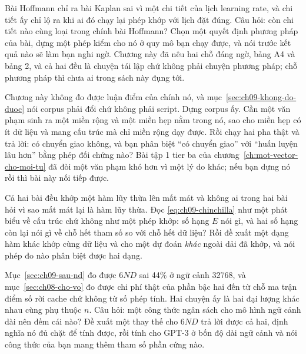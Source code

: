 \tierextend

\begin{bt}
  \item Bài Hoffmann chỉ ra bài Kaplan sai vì một chi tiết của lịch learning
    rate, và chi tiết ấy chỉ lộ ra khi ai đó chạy lại phép khớp với lịch đặt
    đúng. Câu hỏi: còn chi tiết nào cùng loại trong chính bài Hoffmann? Chọn
    một quyết định phương pháp của bài, dựng một phép kiểm cho nó ở quy mô bạn
    chạy được, và nói trước kết quả nào sẽ làm bạn nghi ngờ. Chương này đã nêu
    hai chỗ đáng ngờ, bảng A4 và bảng 2, và cả hai đều là chuyện tái lập chứ
    không phải chuyện phương pháp; chỗ phương pháp thì chưa ai trong sách này
    đụng tới.

  \item Chương này không đo được luận điểm của chính nó, và
    mục~\ref{sec:ch09-khong-do-duoc} nói corpus phải đổi chứ không phải script.
    Dựng corpus ấy. Cần một văn phạm sinh ra một miền rộng và một miền hẹp nằm
    trong nó, sao cho miền hẹp có ít dữ liệu và mang cấu trúc mà chỉ miền rộng
    dạy được. Rồi chạy hai pha thật và trả lời: có chuyển giao không, và bạn
    phân biệt \enquote{có chuyển giao} với \enquote{huấn luyện lâu hơn} bằng
    phép đối chứng nào? Bài tập 1 tier ba của
    chương~\ref{ch:mot-vector-cho-moi-tu} đã đòi một văn phạm khó hơn vì một lý
    do khác; nếu bạn dựng nó rồi thì bài này nối tiếp được.

  \item Cả hai bài  đều khớp một hàm lũy thừa
    lên mất mát và
    không ai trong hai bài hỏi vì sao mất mát lại là hàm lũy thừa. Đọc
    \eqref{eq:ch09-chinchilla} như một phát biểu về cấu trúc chứ không như một
    phép khớp: số hạng \(E\) nói gì, và hai số hạng còn lại nói gì về chỗ hết
    tham số so với chỗ hết dữ liệu? Rồi đề xuất một dạng hàm khác khớp cùng dữ
    liệu và cho một dự đoán \emph{khác} ngoài dải đã khớp, và nói phép đo nào
    phân biệt được hai dạng.

  \item Mục~\ref{sec:ch09-sau-nd} đo được \(6ND\) sai 44\% ở ngữ cảnh 32768, và
    mục~\ref{sec:ch08-cho-vo} đo được chi phí thật của phần bậc hai đến từ chỗ
    ma trận điểm số rời cache chứ không từ số phép tính. Hai chuyện ấy là hai
    đại lượng khác nhau cùng phụ thuộc \(n\). Câu hỏi: một công thức ngân sách
    cho mô hình ngữ cảnh dài nên đếm cái nào? Đề xuất một thay thế cho \(6ND\)
    trả lời được cả hai, định nghĩa nó đủ chặt để tính được, rồi tính cho GPT-3
    ở bốn độ dài ngữ cảnh và nói công thức của bạn mang thêm tham số phần cứng
    nào.
\end{bt}
